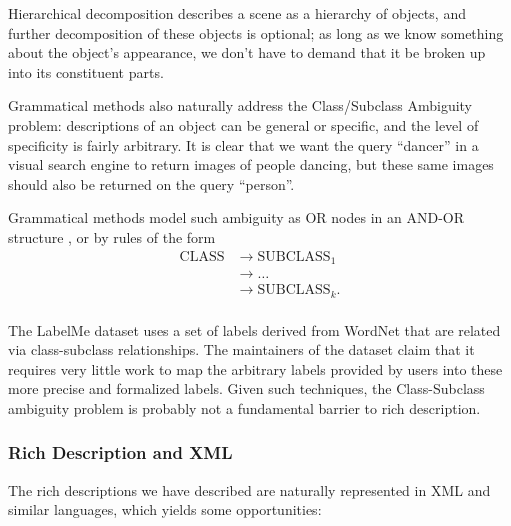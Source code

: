 \documentclass{article}
\begin{document}
Hierarchical decomposition describes a scene as a hierarchy of
objects, and further decomposition of these objects is optional; as
long as we know something about the object's appearance, we don't have
to demand that it be broken up into its constituent parts.

\item Grammatical methods also naturally address the Class/Subclass
  Ambiguity problem: descriptions of an object can be general or
  specific, and the level of specificity is fairly arbitrary. It is
  clear that we want the query ``dancer'' in a visual search engine to
  return images of people dancing, but these same images should also
  be returned on the query ``person''. 

  Grammatical methods model such ambiguity as OR nodes in an AND-OR
  structure \cite{zhu-mumford}, or by rules of the form
\begin{align*}
\mathrm{CLASS} &\to \mathrm{SUBCLASS}_1\\
&\to \dots\\
&\to \mathrm{SUBCLASS}_k .\\
\end{align*}

The LabelMe dataset uses a set of labels derived from WordNet
\cite{wordnet} that are related via class-subclass
relationships. The maintainers of the dataset claim that it requires
very little work to map the arbitrary labels provided by users into
these more precise and formalized labels. \cite{labelme} Given
such techniques, the Class-Subclass ambiguity problem is probably not
a fundamental barrier to rich description.

\eitem

\subsubsection{Rich Description and XML}

The rich descriptions we have described are naturally represented in
XML and similar languages, which yields some opportunities: 
\end{document}
